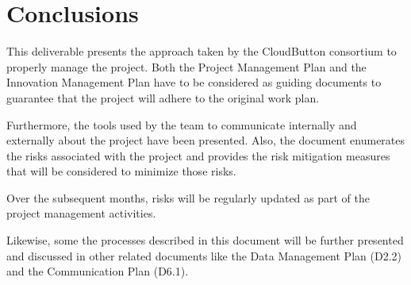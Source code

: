 \documentclass[a4paper,11pt]{article}
\begin{document}
\newpage

\section{Conclusions}
\label{sec:conclusions}

This deliverable presents the approach taken by the CloudButton consortium to properly manage the project. Both the Project Management Plan and the Innovation Management Plan have to be considered as guiding documents to guarantee that the project will adhere to the
original work plan. 

Furthermore, the tools used by the team to communicate
internally and externally about the project have been presented. Also, the document enumerates the risks associated with the project and provides the risk mitigation measures that will be considered to minimize those risks.

Over the subsequent months, risks will be regularly updated as part of the project management
activities.

Likewise, some the processes described in this document will be further presented and discussed in other related documents like the Data Management Plan (D2.2) and the Communication Plan (D6.1).

\newpage
\end{document}
